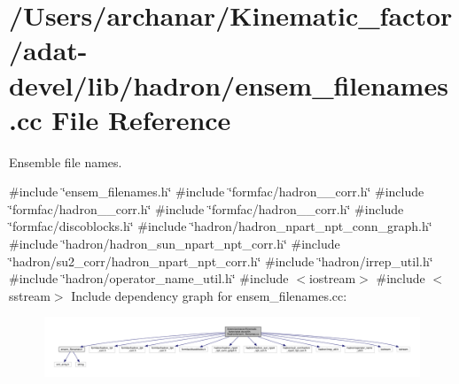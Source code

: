 \hypertarget{adat-devel_2lib_2hadron_2ensem__filenames_8cc}{}\section{/\+Users/archanar/\+Kinematic\+\_\+factor/adat-\/devel/lib/hadron/ensem\+\_\+filenames.cc File Reference}
\label{adat-devel_2lib_2hadron_2ensem__filenames_8cc}


Ensemble file names.  


{\ttfamily \#include \char`\"{}ensem\+\_\+filenames.\+h\char`\"{}}\newline
{\ttfamily \#include \char`\"{}formfac/hadron\+\_\+1pt\+\_\+corr.\+h\char`\"{}}\newline
{\ttfamily \#include \char`\"{}formfac/hadron\+\_\+2pt\+\_\+corr.\+h\char`\"{}}\newline
{\ttfamily \#include \char`\"{}formfac/hadron\+\_\+3pt\+\_\+corr.\+h\char`\"{}}\newline
{\ttfamily \#include \char`\"{}formfac/discoblocks.\+h\char`\"{}}\newline
{\ttfamily \#include \char`\"{}hadron/hadron\+\_\+npart\+\_\+npt\+\_\+conn\+\_\+graph.\+h\char`\"{}}\newline
{\ttfamily \#include \char`\"{}hadron/hadron\+\_\+sun\+\_\+npart\+\_\+npt\+\_\+corr.\+h\char`\"{}}\newline
{\ttfamily \#include \char`\"{}hadron/su2\+\_\+corr/hadron\+\_\+npart\+\_\+npt\+\_\+corr.\+h\char`\"{}}\newline
{\ttfamily \#include \char`\"{}hadron/irrep\+\_\+util.\+h\char`\"{}}\newline
{\ttfamily \#include \char`\"{}hadron/operator\+\_\+name\+\_\+util.\+h\char`\"{}}\newline
{\ttfamily \#include $<$iostream$>$}\newline
{\ttfamily \#include $<$sstream$>$}\newline
Include dependency graph for ensem\+\_\+filenames.\+cc\+:
\nopagebreak
\begin{figure}[H]
\begin{center}
\leavevmode
\includegraphics[width=350pt]{df/d98/adat-devel_2lib_2hadron_2ensem__filenames_8cc__incl}
\end{center}
\end{figure}
